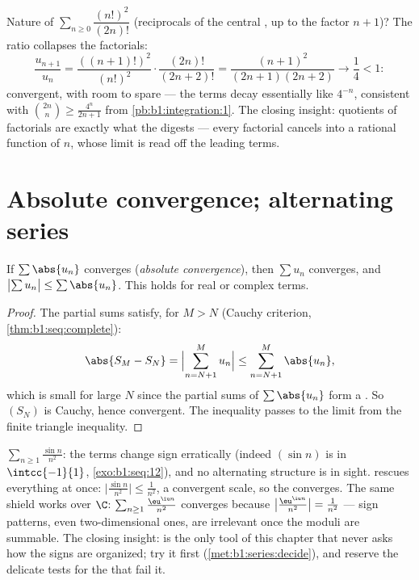 \begin{example}\label{ex:b1:series:ratiobinom}
Nature of $\sum_{n\geq0} \dfrac{(n!)^2}{(2n)!}$ (reciprocals of
the central , up to the factor $n + 1$)?
The ratio collapses the factorials:
\[
\frac{u_{n+1}}{u_n}
= \frac{((n+1)!)^2}{(n!)^2}\cdot\frac{(2n)!}{(2n+2)!}
= \frac{(n+1)^2}{(2n+1)(2n+2)}
\longrightarrow \frac14 < 1 :
\]
convergent, with room to spare --- the terms decay essentially
like $4^{-n}$, consistent with $\binom{2n}{n} \geq
\frac{4^n}{2n+1}$ from \cref{pb:b1:integration:1}. The closing
insight: quotients of factorials are exactly what the 
digests --- every factorial cancels into a rational function of
$n$, whose limit is read off the leading terms.
\end{example}

\section{Absolute convergence; alternating series}

\begin{theorem}\label{thm:b1:series:absolute}
If $\sum \abs{u_n}$ converges (\emph{absolute
convergence}), then $\sum u_n$ converges,
and $\bigl|\sum u_n\bigr| \leq \sum \abs{u_n}$. This holds for real
or complex terms.
\end{theorem}

\begin{proof}
The partial sums satisfy, for $M > N$ (Cauchy criterion,
\cref{thm:b1:seq:complete}):
\[
\abs{S_M - S_N} = \Bigl| \sum_{n=N+1}^{M} u_n \Bigr|
\leq \sum_{n=N+1}^{M} \abs{u_n},
\]
which is small for large $N$ since the partial sums of $\sum\abs{u_n}$
form a . So $(S_N)$ is Cauchy, hence convergent. The
inequality passes to the limit from the finite triangle inequality.
\end{proof}

\begin{example}\label{ex:b1:series:absexamples}
$\sum_{n\geq1} \frac{\sin n}{n^2}$: the terms change sign
erratically (indeed $(\sin n)$ is  in $\intcc{-1}{1}$,
\cref{exo:b1:seq:12}), and no alternating structure is in
sight.  rescues everything at once:
$\bigl|\frac{\sin n}{n^2}\bigr| \leq \frac{1}{n^2}$, a
convergent scale, so the  converges. The same shield works
over $\C$: $\sum_{n\geq1}\frac{\eu^{\iu n}}{n^2}$ converges
because $\bigl|\frac{\eu^{\iu n}}{n^2}\bigr| = \frac{1}{n^2}$
--- sign patterns, even two-dimensional ones, are irrelevant
once the moduli are summable. The closing insight:  is the only tool of this chapter that never asks how
the signs are organized; try it first
(\cref{met:b1:series:decide}), and reserve the delicate tests
for the  that fail it.
\end{example}

